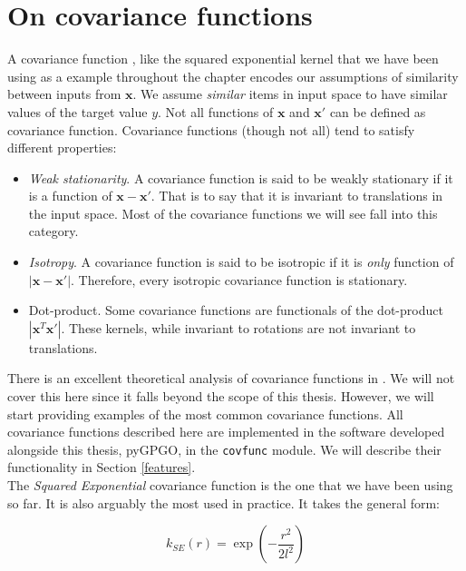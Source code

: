 \documentclass[10pt,a4paper,twoside]{book}
\begin{document}
\section{On covariance functions}
\label{covariancefunc}

A covariance function \cite{Wackernagel1995}, like the squared exponential kernel that we have been using as a example throughout the chapter encodes our assumptions of similarity between inputs from $\boldsymbol{x}$. We assume \textit{similar} items in input space to have similar values of the target value $y$. Not all functions of $\boldsymbol{x}$ and $\boldsymbol{x'}$ can be defined as covariance function. Covariance functions (though not all) tend to satisfy different properties:

\begin{itemize}
\item \textit{Weak stationarity}. A covariance function is said to be weakly stationary if it is a function of $\boldsymbol{x} - \boldsymbol{x'}$. That is to say that it is invariant to translations in the input space. Most of the covariance functions we will see fall into this category.
\item \textit{Isotropy}. A covariance function is said to be isotropic if it is \textit{only} function of  $|\boldsymbol{x} - \boldsymbol{x'}|$. Therefore, every isotropic covariance function is stationary.
\item Dot-product. Some covariance functions are functionals of the dot-product $|\boldsymbol{x}^T \boldsymbol{x'}|$. These kernels, while invariant to rotations are not invariant to translations.
\end{itemize}

There is an excellent theoretical analysis of covariance functions in \cite{Rasmussen2004}. We will not cover this here since it falls beyond the scope of this thesis. However, we will start providing examples of the most common covariance functions. All covariance functions described here are implemented in the software developed alongside this thesis, pyGPGO, in the \texttt{covfunc} module. We will describe their functionality in Section \ref{features}.\\

The \textit{Squared Exponential} covariance function is the one that we have been using so far. It is also arguably the most used in practice. It takes the general form:

\begin{equation}
k_{SE}(r) = \exp\left(-\dfrac{r^2}{2l^2} \right)
\end{equation}
\end{document}
